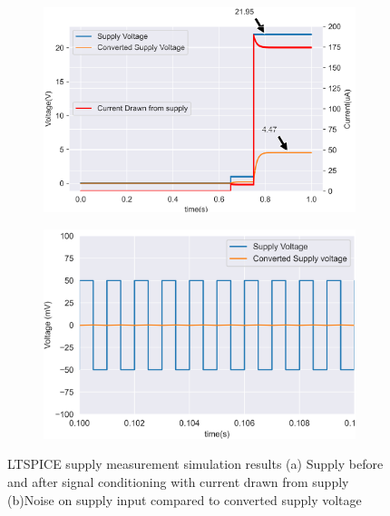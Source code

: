 \begin{figure}[!htb]
	\footnotesize
	\centering
	\begin{subfigure}[]{0.48\textwidth}
		\centering
		\includegraphics[width=1\linewidth]{./Figures/A6/A6supcurrent.png}
		\caption{} \label{subfig:A6gensup}
	\end{subfigure}
	\begin{subfigure}[]{0.48\textwidth}
		\centering
		\includegraphics[width=1\linewidth]{./Figures/A6/A6supnoise.png}
		\caption{ } \label{subfig:A6noiselt}
	\end{subfigure}
	\caption[{LTSPICE supply measurement simulation results}]{LTSPICE supply measurement simulation results   (a)  Supply before and after signal conditioning with current drawn from supply (b)Noise on supply input compared to converted supply voltage }
	\label{fig:A6bat}
\end{figure}

